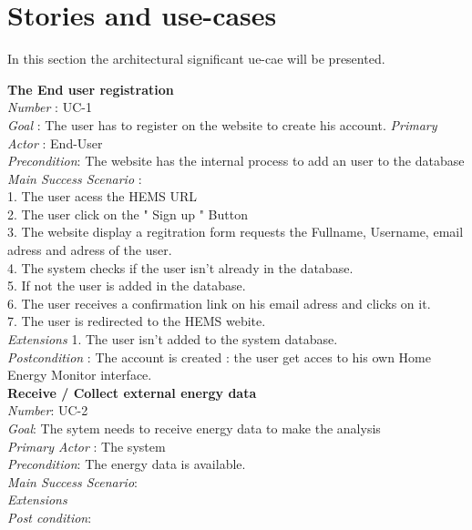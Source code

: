\clearpage
\section{Stories and use-cases}

In this section the architectural significant ue-cae will be presented.



\textbf{The End user registration} \\
\textit{Number} : UC-1 \\
\textit{Goal} : The user has to register on the website to create his account.
\textit{Primary Actor }:  End-User \\
\textit{Precondition}: The website has the internal process to add an user to the database
\textit{Main Success Scenario }: \\
 1. The user acess the HEMS URL \\
 2. The user click on the " Sign up " Button \\
 3. The website display a regitration form requests the Fullname, Username, email adress and adress of the user.\\
 4. The system checks if the user isn't already in the database. \\
 5. If not the user is added in the database. \\
 6. The user receives a confirmation link on his email adress and clicks on it. \\ %
 7. The user is redirected to the HEMS webite. \\
\textit{Extensions} 1. The user isn't added to the system database. \\
\textit{Postcondition} : The account is created : the user get acces to his own Home Energy Monitor interface. \\

\textbf{Receive / Collect external energy data} \\%
\textit{Number}: UC-2 \\
\textit{Goal}: The sytem needs to receive energy data to make the analysis \\
\textit{Primary Actor} : The system \\
\textit{Precondition}: The energy data is available. \\
\textit{Main Success Scenario}: \\
\textit{Extensions} \\
\textit{Post condition}: \\

